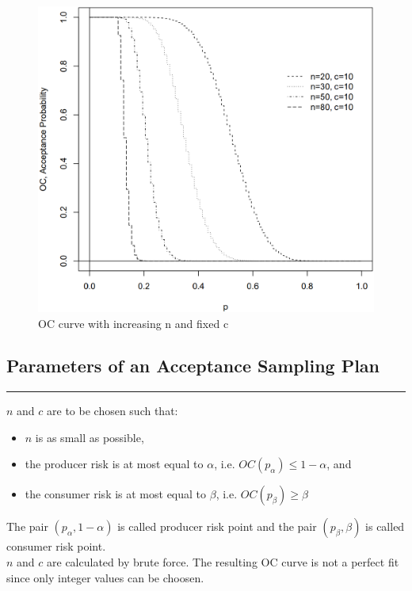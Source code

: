 \begin{figure}[H]
  \centering
  \includegraphics[width=0.8\linewidth]{Pics/5.1.3.png}
  \caption{OC curve with increasing n and fixed c}
\end{figure}

\subsection{Parameters of an Acceptance Sampling Plan}
\noindent\rule[\linienAbstand]{\linewidth}{\linienDicke}
$n$ and $c$ are to be chosen such that:
\begin{itemize}
  \item $n$ is as small as possible,
  \item the producer risk is at most equal to $\alpha$, i.e. $OC(p_{\alpha}) \leq 1 - \alpha$, and
  \item the consumer risk is at most equal to $\beta$, i.e. $OC(p_{\beta}) \geq \beta$
\end{itemize}

The pair $(p_{\alpha}, 1-\alpha)$ is called producer risk point and the pair $(p_{\beta}, \beta)$ is called consumer risk point.\\
$n$ and $c$ are calculated by brute force. The resulting OC curve is not a perfect fit since only integer values can be choosen.\\

